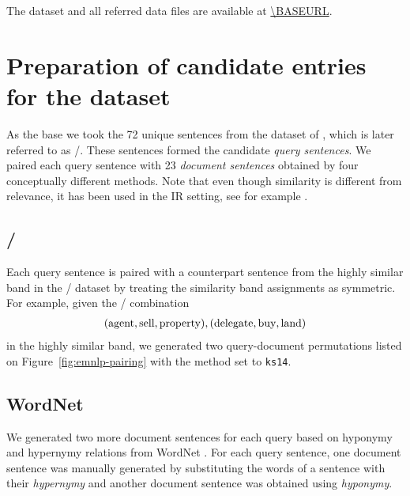 The dataset and all referred data files are available at \url{\BASEURL}.

\section{Preparation of candidate entries for the dataset}
\label{sec:design}

As the base we took the 72 unique sentences from the dataset of \cite{kartsaklis-sadrzadeh:2013:EMNLP,kartsadrqpl2014}, which is later referred to as \emnlp/.\footnotemark{} These sentences formed the candidate \emph{query sentences}. We paired each query sentence with 23 \emph{document sentences} obtained by four conceptually different methods. Note that even though similarity is different from relevance, it has been used in the IR setting, see for example .
%



\subsection{\emnlp/}

Each query sentence is paired with a counterpart sentence from the highly similar band\footnotemark{} in the \emnlp/ dataset by treating the similarity band assignments as symmetric. For example, given the \emnlp/ combination
%
%
\begin{eqnarray*}
(\textmd{agent}, \textmd{sell}, \textmd{property}),
(\textmd{delegate}, \textmd{buy}, \textmd{land})
\end{eqnarray*}
%
in the highly similar band, we generated two query-document permutations listed on Figure~\ref{fig:emnlp-pairing} with the method set to \texttt{ks14}.

\subsection{WordNet}
We generated two more document sentences for each query based on hyponymy and hypernymy relations from WordNet \cite{Miller:1995:WLD:219717.219748}. For each query sentence, one document sentence was manually generated by substituting the words of a sentence with their \emph{hypernymy} and another document sentence was obtained using \emph{hyponymy}.

